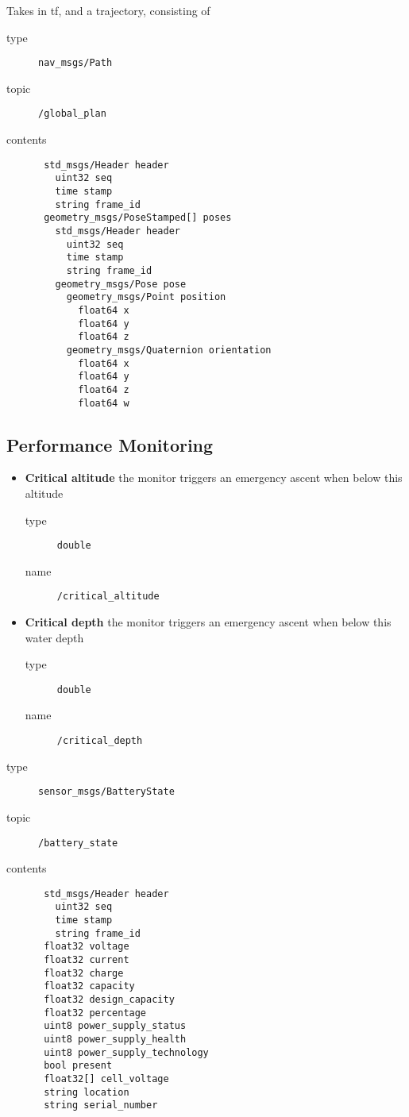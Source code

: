\documentclass[9pt,technote]{IEEEtran} %
\begin{document}
Takes in tf, and a trajectory, consisting of 

\begin{description}
\item[type] \texttt{nav\_msgs/Path}
\item[topic] \texttt{/global\_plan}
\item[contents] \begin{scriptsize}
\begin{verbatim}
 std_msgs/Header header
   uint32 seq
   time stamp
   string frame_id
 geometry_msgs/PoseStamped[] poses
   std_msgs/Header header
     uint32 seq
     time stamp
     string frame_id
   geometry_msgs/Pose pose
     geometry_msgs/Point position
       float64 x
       float64 y
       float64 z
     geometry_msgs/Quaternion orientation
       float64 x
       float64 y
       float64 z
       float64 w
\end{verbatim}
\end{scriptsize}
\end{description}

\subsection{Performance Monitoring}
\label{monitor}

\begin{itemize}
\item \textbf{Critical altitude} the monitor triggers an emergency ascent when below this altitude \begin{description}
\item[type] \texttt{double}
\item[name] \texttt{/critical\_altitude}
\end{description}
\item \textbf{Critical depth} the monitor triggers an emergency ascent when below this water depth \begin{description}
\item[type] \texttt{double}
\item[name] \texttt{/critical\_depth}
\end{description}  
\end{itemize}

\begin{description}
\item[type] \texttt{sensor\_msgs/BatteryState}
\item[topic] \texttt{/battery\_state}
\item[contents] \begin{scriptsize}
\begin{verbatim}
 std_msgs/Header header
   uint32 seq
   time stamp
   string frame_id
 float32 voltage
 float32 current
 float32 charge
 float32 capacity
 float32 design_capacity
 float32 percentage
 uint8 power_supply_status
 uint8 power_supply_health
 uint8 power_supply_technology
 bool present
 float32[] cell_voltage
 string location
 string serial_number
\end{verbatim}
\end{scriptsize}
\end{description}


%
%
\end{document}
